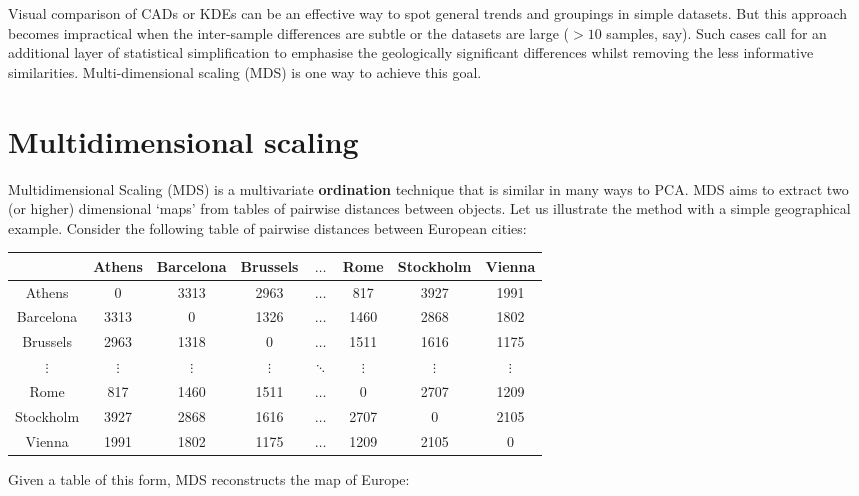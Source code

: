\begin{refsection}
Visual comparison of CADs or KDEs can be an effective way to spot
general trends and groupings in simple datasets. But this approach
becomes impractical when the inter-sample differences are subtle or
the datasets are large ($>10$ samples, say). Such cases call for an
additional layer of statistical simplification to emphasise the
geologically significant differences whilst removing the less
informative similarities. Multi-dimensional scaling (MDS) is one way
to achieve this goal.

\section{Multidimensional scaling}

Multidimensional Scaling (MDS) is a multivariate \textbf{ordination}
technique that is similar in many ways to PCA. MDS aims to extract two
(or higher) dimensional `maps' from tables of pairwise distances
between objects. Let us illustrate the method with a simple
geographical example. Consider the following table of pairwise
distances between European cities:

\begin{center}
  \begin{tabular}{c|ccccccc}
  &  Athens & Barcelona & Brussels & $\ldots$ & Rome & Stockholm & Vienna \\ \hline
Athens & 0 & 3313 & 2963 & $\ldots$ & 817 & 3927 & 1991 \\
Barcelona & 3313 & 0 & 1326 & $\ldots$ & 1460 & 2868 & 1802 \\
Brussels & 2963 & 1318 & 0 & $\ldots$ & 1511 & 1616 & 1175 \\
$\vdots$ & $\vdots$ & $\vdots$ & $\vdots$ & $\ddots$ &
$\vdots$  & $\vdots$ & $\vdots$ \\
Rome & 817 & 1460 & 1511 & $\ldots$ & 0 & 2707 & 1209 \\
Stockholm & 3927 & 2868 & 1616 & $\ldots$ & 2707 & 0 & 2105 \\
Vienna & 1991 & 1802 & 1175 & $\ldots$ & 1209 & 2105 & 0 
  \end{tabular}
  \label{tab:eurodist}
\end{center}

Given a table of this form, MDS reconstructs the map of Europe:


\end{refsection}
